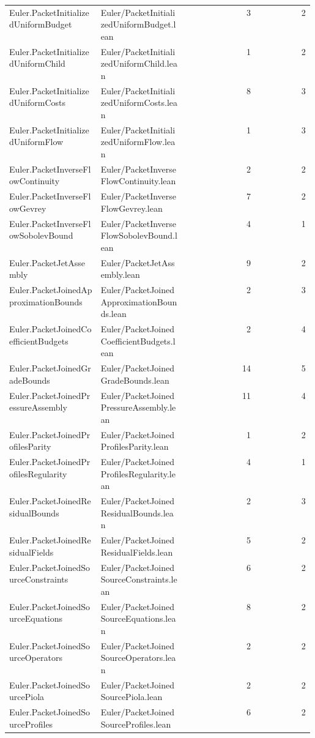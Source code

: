 \begin{longtable}{p{0.30\linewidth}p{0.28\linewidth}rr}
Euler.PacketInitializedUniformBudget & Euler/PacketInitializedUniformBudget.lean & 3 & 2\\
Euler.PacketInitializedUniformChild & Euler/PacketInitializedUniformChild.lean & 1 & 2\\
Euler.PacketInitializedUniformCosts & Euler/PacketInitializedUniformCosts.lean & 8 & 3\\
Euler.PacketInitializedUniformFlow & Euler/PacketInitializedUniformFlow.lean & 1 & 3\\
Euler.PacketInverseFlowContinuity & Euler/PacketInverseFlowContinuity.lean & 2 & 2\\
Euler.PacketInverseFlowGevrey & Euler/PacketInverseFlowGevrey.lean & 7 & 2\\
Euler.PacketInverseFlowSobolevBound & Euler/PacketInverseFlowSobolevBound.lean & 4 & 1\\
Euler.PacketJetAssembly & Euler/PacketJetAssembly.lean & 9 & 2\\
Euler.PacketJoinedApproximationBounds & Euler/PacketJoinedApproximationBounds.lean & 2 & 3\\
Euler.PacketJoinedCoefficientBudgets & Euler/PacketJoinedCoefficientBudgets.lean & 2 & 4\\
Euler.PacketJoinedGradeBounds & Euler/PacketJoinedGradeBounds.lean & 14 & 5\\
Euler.PacketJoinedPressureAssembly & Euler/PacketJoinedPressureAssembly.lean & 11 & 4\\
Euler.PacketJoinedProfilesParity & Euler/PacketJoinedProfilesParity.lean & 1 & 2\\
Euler.PacketJoinedProfilesRegularity & Euler/PacketJoinedProfilesRegularity.lean & 4 & 1\\
Euler.PacketJoinedResidualBounds & Euler/PacketJoinedResidualBounds.lean & 2 & 3\\
Euler.PacketJoinedResidualFields & Euler/PacketJoinedResidualFields.lean & 5 & 2\\
Euler.PacketJoinedSourceConstraints & Euler/PacketJoinedSourceConstraints.lean & 6 & 2\\
Euler.PacketJoinedSourceEquations & Euler/PacketJoinedSourceEquations.lean & 8 & 2\\
Euler.PacketJoinedSourceOperators & Euler/PacketJoinedSourceOperators.lean & 2 & 2\\
Euler.PacketJoinedSourcePiola & Euler/PacketJoinedSourcePiola.lean & 2 & 2\\
Euler.PacketJoinedSourceProfiles & Euler/PacketJoinedSourceProfiles.lean & 6 & 2\\

\end{longtable}
